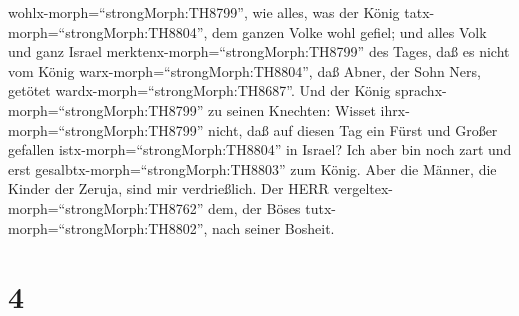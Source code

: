 wohlx-morph=``strongMorph:TH8799'', wie alles, was der König
tatx-morph=``strongMorph:TH8804'', dem ganzen Volke wohl gefiel;
 und alles Volk und ganz Israel
merktenx-morph=``strongMorph:TH8799'' des Tages, daß es nicht vom König
warx-morph=``strongMorph:TH8804'', daß Abner, der Sohn Ners, getötet
wardx-morph=``strongMorph:TH8687''.  Und der König
sprachx-morph=``strongMorph:TH8799'' zu seinen Knechten: Wisset
ihrx-morph=``strongMorph:TH8799'' nicht, daß auf diesen Tag ein Fürst
und Großer gefallen istx-morph=``strongMorph:TH8804'' in Israel?
 Ich aber bin noch zart und erst
gesalbtx-morph=``strongMorph:TH8803'' zum König. Aber die Männer, die
Kinder der Zeruja, sind mir verdrießlich. Der HERR
vergeltex-morph=``strongMorph:TH8762'' dem, der Böses
tutx-morph=``strongMorph:TH8802'', nach seiner Bosheit.

\hypertarget{section-3}{%
\section{4}\label{section-3}}

